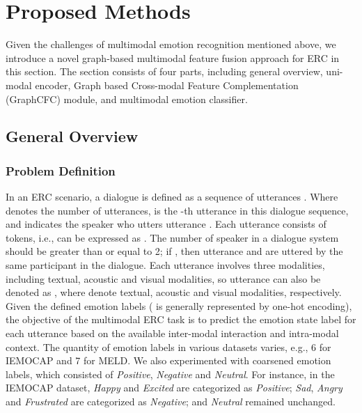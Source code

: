 \documentclass[lettersize,journal]{IEEEtran}
\begin{document}
\section{Proposed Methods}\label{sec:proposed_methods}
Given the challenges of multimodal emotion recognition mentioned above, we introduce a novel graph-based multimodal feature fusion approach for ERC in this section. The section consists of four parts, including general overview, uni-modal encoder, Graph based Cross-modal Feature Complementation (GraphCFC) module, and multimodal emotion classifier.

\subsection{General Overview}
\subsubsection{Problem Definition}
In an ERC scenario, a dialogue is defined as a sequence of  utterances . Where  denotes the number of utterances,  is the -th utterance in this dialogue sequence, and  indicates the speaker who utters utterance . Each utterance  consists of  tokens, i.e.,  can be expressed as . The number of speaker  in a dialogue system should be greater than or equal to 2; if , then utterance  and  are uttered by the same participant in the dialogue. Each utterance  involves three modalities, including textual, acoustic and visual modalities, so utterance  can also be denoted as , where  denote textual, acoustic and visual modalities, respectively. Given the defined emotion labels  ( is generally represented by one-hot encoding), the objective of the multimodal ERC task is to predict the emotion state label  for each utterance  based on the available inter-modal interaction and intra-modal context. The quantity of emotion labels in various datasets varies, e.g., 6 for IEMOCAP and 7 for MELD. We also experimented with coarsened emotion labels, which consisted of \textit{Positive}, \textit{Negative} and \textit{Neutral}. For instance, in the IEMOCAP dataset, \textit{Happy} and \textit{Excited} are categorized as \textit{Positive}; \textit{Sad}, \textit{Angry} and \textit{Frustrated} are categorized as \textit{Negative}; and \textit{Neutral} remained unchanged.
\end{document}
